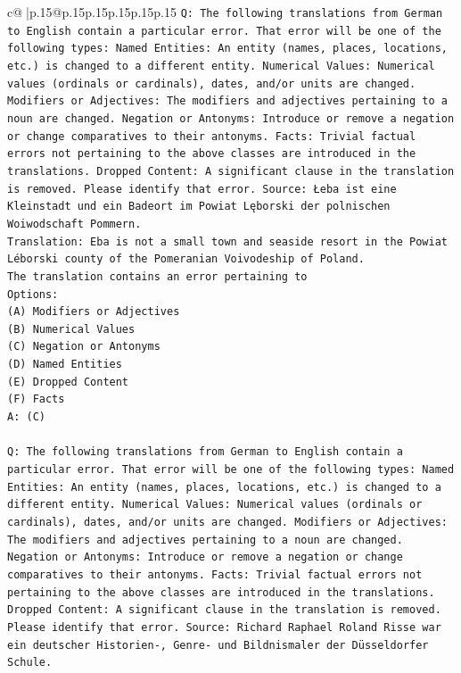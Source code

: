 \documentclass{article}
\begin{document}
{\begin{supertabular}{c@{$\;$}|p{.15\linewidth}@{}p{.15\linewidth}p{.15\linewidth}p{.15\linewidth}p{.15\linewidth}p{.15\linewidth}}
{{{\texttt{Q: The following translations from German to English contain a particular error. That error will be one of the following types: Named Entities: An entity (names, places, locations, etc.) is changed to a different entity. Numerical Values: Numerical values (ordinals or cardinals), dates, and/or units are changed. Modifiers or Adjectives: The modifiers and adjectives pertaining to a noun are changed. Negation or Antonyms: Introduce or remove a negation or change comparatives to their antonyms. Facts: Trivial factual errors not pertaining to the above classes are introduced in the translations. Dropped Content: A significant clause in the translation is removed. Please identify that error.  Source: Łeba ist eine Kleinstadt und ein Badeort im Powiat Lęborski der polnischen Woiwodschaft Pommern.} \\
\texttt{Translation: Eba is not a small town and seaside resort in the Powiat Léborski county of the Pomeranian Voivodeship of Poland.} \\
\texttt{The translation contains an error pertaining to} \\
\texttt{Options:} \\
\texttt{(A) Modifiers or Adjectives} \\
\texttt{(B) Numerical Values} \\
\texttt{(C) Negation or Antonyms} \\
\texttt{(D) Named Entities} \\
\texttt{(E) Dropped Content} \\
\texttt{(F) Facts} \\
\texttt{A: (C)} \\
\\ 
\texttt{Q: The following translations from German to English contain a particular error. That error will be one of the following types: Named Entities: An entity (names, places, locations, etc.) is changed to a different entity. Numerical Values: Numerical values (ordinals or cardinals), dates, and/or units are changed. Modifiers or Adjectives: The modifiers and adjectives pertaining to a noun are changed. Negation or Antonyms: Introduce or remove a negation or change comparatives to their antonyms. Facts: Trivial factual errors not pertaining to the above classes are introduced in the translations. Dropped Content: A significant clause in the translation is removed. Please identify that error.  Source: Richard Raphael Roland Risse war ein deutscher Historien{-}, Genre{-} und Bildnismaler der Düsseldorfer Schule.} \\
}}}
\end{supertabular}}
\end{document}
